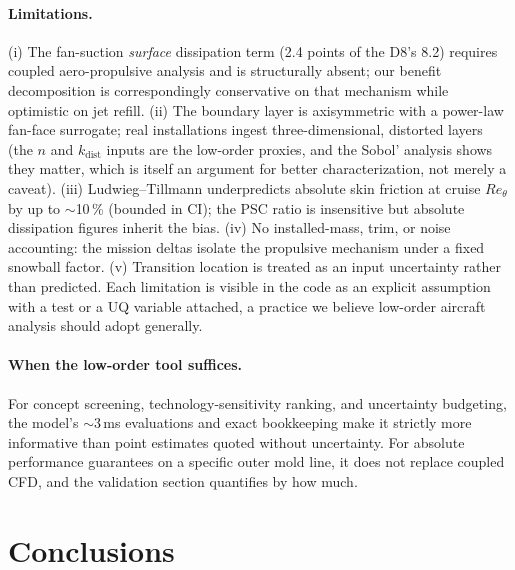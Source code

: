 \documentclass[10pt]{article}
\begin{document}
\paragraph{Limitations.} (i) The fan-suction \emph{surface} dissipation
term (2.4 points of the D8's 8.2) requires coupled aero-propulsive
analysis and is structurally absent; our benefit decomposition is
correspondingly conservative on that mechanism while optimistic on jet
refill. (ii) The boundary layer is axisymmetric with a power-law fan-face
surrogate; real installations ingest three-dimensional, distorted layers
(the $n$ and $k_{\mathrm{dist}}$ inputs are the low-order proxies, and the
Sobol' analysis shows they matter, which is itself an argument for
better characterization, not merely a caveat). (iii) Ludwieg--Tillmann
underpredicts absolute skin friction at cruise $Re_\theta$ by up to
$\sim$10\,\% (bounded in CI); the PSC ratio is insensitive but absolute
dissipation figures inherit the bias. (iv) No installed-mass, trim, or
noise accounting: the mission deltas isolate the propulsive mechanism under
a fixed snowball factor. (v) Transition location is treated as an input
uncertainty rather than predicted. Each limitation is visible in the code
as an explicit assumption with a test or a UQ variable attached, a
practice we believe low-order aircraft analysis should adopt generally.

\paragraph{When the low-order tool suffices.} For concept screening,
technology-sensitivity ranking, and uncertainty budgeting, the model's
$\sim$3\,ms evaluations and exact bookkeeping make it strictly more
informative than point estimates quoted without uncertainty. For absolute
performance guarantees on a specific outer mold line, it does not replace
coupled CFD, and the validation section quantifies by how much.

\section{Conclusions}\label{sec:conclusions}
\end{document}
